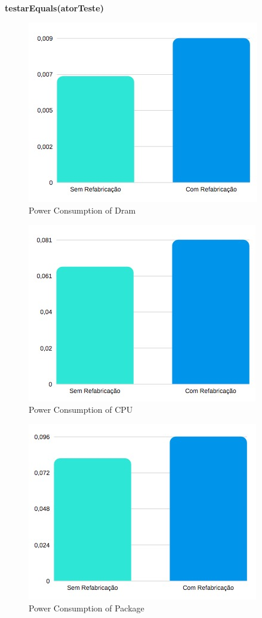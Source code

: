 \newpage 
\textbf{testarEquals(atorTeste)}

\begin{figure}[H]
    \centering
    \includegraphics[scale=0.8]{tex/img/graficos/12.jpg}
    \caption{Power Consumption of Dram}
\end{figure}

\begin{figure}[H]
    \centering
    \includegraphics[scale=0.8]{tex/img/graficos/13.jpg}
    \caption{Power Consumption of CPU}
\end{figure}

\begin{figure}[H]
    \centering
    \includegraphics[scale=0.8]{tex/img/graficos/14.jpg}
    \caption{Power Consumption of Package}
\end{figure}



